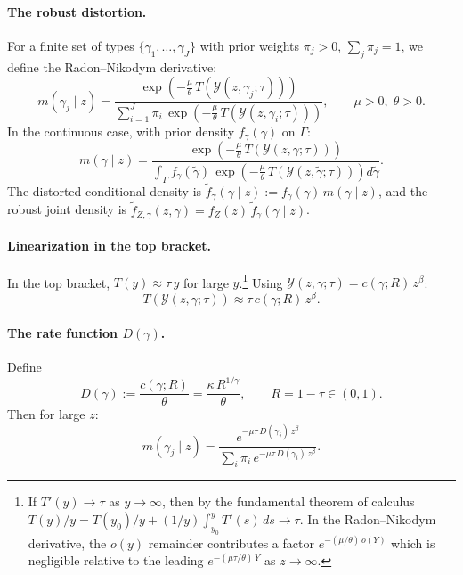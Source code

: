 \documentclass[12pt,a4paper]{article}
\theoremstyle{definition}
\theoremstyle{plain}
\theoremstyle{remark}
\newcommand{\calY}{\mathcal{Y}}
\begin{document}
\paragraph{The robust distortion.}

For a finite set of types $\{\gamma_1,\ldots,\gamma_J\}$ with prior weights $\pi_j > 0$, $\sum_j \pi_j = 1$, we define the Radon--Nikodym derivative:
\begin{equation}
\label{eq:RN_discrete_2D}
  m(\gamma_j \mid z) = \frac{\exp\!\left(-\frac{\mu}{\theta}\,T(\calY(z,\gamma_j;\tau))\right)}
  {\sum_{i=1}^J \pi_i\,\exp\!\left(-\frac{\mu}{\theta}\,T(\calY(z,\gamma_i;\tau))\right)}, \qquad \mu > 0,\;\theta > 0.
\end{equation}
In the continuous case, with prior density $f_{\gamma}(\gamma)$ on $\Gamma$:
\begin{equation}
\label{eq:RN_cont_2D}
  m(\gamma \mid z) = \frac{\exp\!\left(-\frac{\mu}{\theta}\,T(\calY(z,\gamma;\tau))\right)}
  {\int_{\Gamma} f_{\gamma}(\tilde\gamma)\,\exp\!\left(-\frac{\mu}{\theta}\,T(\calY(z,\tilde\gamma;\tau))\right)d\tilde\gamma}.
\end{equation}
The distorted conditional density is $\widetilde{f}_{\gamma}(\gamma \mid z) := f_{\gamma}(\gamma)\,m(\gamma \mid z)$, and the robust joint density is $\widetilde{f}_{Z,\gamma}(z,\gamma) = f_Z(z)\,\widetilde{f}_{\gamma}(\gamma \mid z)$.

\paragraph{Linearization in the top bracket.}

In the top bracket, $T(y) \approx \tau\,y$ for large $y$.\footnote{If $T'(y) \to \tau$ as $y \to \infty$, then by the fundamental theorem of calculus $T(y)/y = T(y_0)/y + (1/y)\int_{y_0}^y T'(s)\,ds \to \tau$.  In the Radon--Nikodym derivative, the $o(y)$ remainder contributes a factor $e^{-(\mu/\theta)\,o(Y)}$ which is negligible relative to the leading $e^{-(\mu\tau/\theta)\,Y}$ as $z \to \infty$.}  Using $\calY(z,\gamma;\tau) = c(\gamma;R)\,z^{\beta}$:
\[
  T(\calY(z,\gamma;\tau)) \approx \tau\,c(\gamma;R)\,z^{\beta}.
\]

\paragraph{The rate function $D(\gamma)$.}

Define
\begin{equation}
\label{eq:D_rate_2D}
  D(\gamma) := \frac{c(\gamma;R)}{\theta} = \frac{\kappa\,R^{1/\gamma}}{\theta}, \qquad R = 1-\tau \in (0,1).
\end{equation}
Then for large $z$:
\[
  m(\gamma_j \mid z) = \frac{e^{-\mu\tau\,D(\gamma_j)\,z^{\beta}}}{\sum_i \pi_i\,e^{-\mu\tau\,D(\gamma_i)\,z^{\beta}}}.
\]
\end{document}
